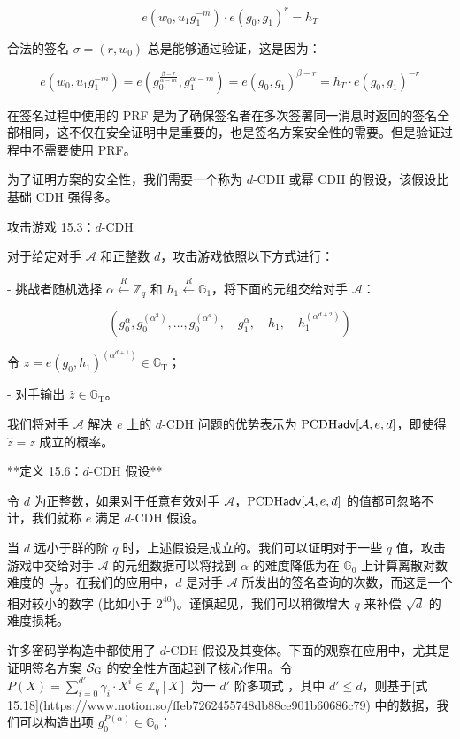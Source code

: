 \[
e(w_0,u_1g_1^{-m})\cdot e(g_0,g_1)^r=h_T
\]

合法的签名 $\sigma=(r,w_0)$ 总是能够通过验证，这是因为：

\[
e(w_0,u_1g_1^{-m})=e(g_0^{\frac{\beta-r}{\alpha-m}},g_1^{\alpha-m})=e(g_0,g_1)^{\beta-r}=h_T\cdot e(g_0,g_1)^{-r}
\]

在签名过程中使用的 PRF 是为了确保签名者在多次签署同一消息时返回的签名全部相同，这不仅在安全证明中是重要的，也是签名方案安全性的需要。但是验证过程中不需要使用 PRF。

为了证明方案的安全性，我们需要一个称为 $d$-CDH 或幂 CDH 的假设，该假设比基础 CDH 强得多。

攻击游戏 15.3：$d$-CDH

对于给定对手 $\mathcal{A}$ 和正整数 $d$，攻击游戏依照以下方式进行：

- 挑战者随机选择 $\alpha \overset{R}\leftarrow \mathbb{Z}_q$ 和 $h_1\overset{R}\leftarrow\mathbb{G}_1$，将下面的元组交给对手 $\mathcal{A}$：
    
    \[
    (
    g_0^\alpha,
    g_0^{(\alpha^2)},
    \dots,
    g_0^{(\alpha^d)},
    \quad
    g_1^\alpha,
    \quad
    h_1,
    \quad
    h_1^{(\alpha^{d+2})}
    )
    \]
    
    令 $z=e(g_0,h_1)^{(\alpha^{d+1})}\in\mathbb{G}_\mathrm{T}$；
    
- 对手输出 $\hat{z}\in\mathbb{G}_\mathrm{T}$。

我们将对手 $\mathcal{A}$ 解决 $e$ 上的 $d$-CDH 问题的优势表示为 ${\rm PCDH\mathsf{adv}}[\mathcal{A},e,d]$，即使得 $\hat{z}=z$ 成立的概率。

**定义 15.6：$d$-CDH 假设**

令 $d$ 为正整数，如果对于任意有效对手 $\mathcal{A}$，${\rm PCDH\mathsf{adv}}[\mathcal{A},e,d]$ 的值都可忽略不计，我们就称 $e$ 满足 $d$-CDH 假设。

当 $d$ 远小于群的阶 $q$ 时，上述假设是成立的。我们可以证明对于一些 $q$ 值，攻击游戏中交给对手 $\mathcal{A}$ 的元组数据可以将找到 $\alpha$ 的难度降低为在 $\mathbb{G}_0$ 上计算离散对数难度的 $\frac{1}{\sqrt{d}}$。在我们的应用中，$d$ 是对手 $\mathcal{A}$ 所发出的签名查询的次数，而这是一个相对较小的数字 (比如小于 $2^{40}$)。谨慎起见，我们可以稍微增大 $q$ 来补偿 $\sqrt{d}$ 的难度损耗。

许多密码学构造中都使用了 $d$-CDH 假设及其变体。下面的观察在应用中，尤其是证明签名方案 $\mathcal{S}_{\rm G}$ 的安全性方面起到了核心作用。令 $P(X)=\sum_{i=0}^{d'}\gamma_i\cdot X^i\in\mathbb{Z}_q[X]$ 为一 $d'$ 阶多项式 ，其中 $d'\leq d$，则基于[式 15.18](https://www.notion.so/ffeb7262455748db88ce901b60686c79) 中的数据，我们可以构造出项 $g_0^{P(\alpha)}\in\mathbb{G}_0$：

